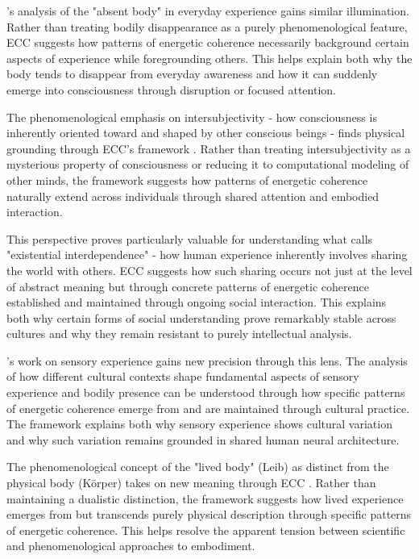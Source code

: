\cite{leder1990absent}'s analysis of the "absent body" in everyday experience gains similar illumination. Rather than treating bodily disappearance as a purely phenomenological feature, ECC suggests how patterns of energetic coherence necessarily background certain aspects of experience while foregrounding others. This helps explain both why the body tends to disappear from everyday awareness and how it can suddenly emerge into consciousness through disruption or focused attention.

The phenomenological emphasis on intersubjectivity - how consciousness is inherently oriented toward and shaped by other conscious beings - finds physical grounding through ECC's framework \cite{jackson1996things}. Rather than treating intersubjectivity as a mysterious property of consciousness or reducing it to computational modeling of other minds, the framework suggests how patterns of energetic coherence naturally extend across individuals through shared attention and embodied interaction.

This perspective proves particularly valuable for understanding what \cite{jackson1996things} calls "existential interdependence" - how human experience inherently involves sharing the world with others. ECC suggests how such sharing occurs not just at the level of abstract meaning but through concrete patterns of energetic coherence established and maintained through ongoing social interaction. This explains both why certain forms of social understanding prove remarkably stable across cultures and why they remain resistant to purely intellectual analysis.

\cite{desjarlais1992body}'s work on sensory experience gains new precision through this lens. The analysis of how different cultural contexts shape fundamental aspects of sensory experience and bodily presence can be understood through how specific patterns of energetic coherence emerge from and are maintained through cultural practice. The framework explains both why sensory experience shows cultural variation and why such variation remains grounded in shared human neural architecture.

The phenomenological concept of the "lived body" (Leib) as distinct from the physical body (Körper) takes on new meaning through ECC \cite{varela1991embodied}. Rather than maintaining a dualistic distinction, the framework suggests how lived experience emerges from but transcends purely physical description through specific patterns of energetic coherence. This helps resolve the apparent tension between scientific and phenomenological approaches to embodiment.

